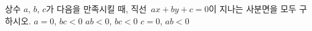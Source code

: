 상수 $a$, $b$, $c$가 다음을 만족시킬 때, 직선~$ax+by+c=0$이 지나는 사분면을 모두 구하시오.
 $a=0$, $bc<0$
 $ab<0$, $bc<0$
 $c=0$, $ab<0$
